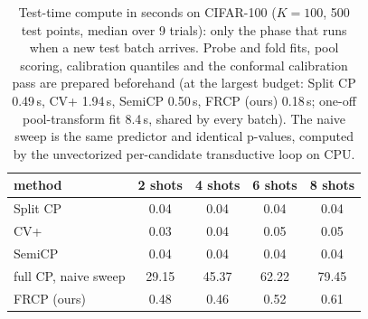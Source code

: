 \begin{table}[t]
\centering
\small
\setlength{\tabcolsep}{5pt}
\caption{Test-time compute in seconds on CIFAR-100 ($K=100$, 500 test points, median over 9 trials): only the phase that runs when a new test batch arrives. Probe and fold fits, pool scoring, calibration quantiles and the conformal calibration pass are prepared beforehand (at the largest budget: Split CP 0.49\,s, CV+ 1.94\,s, SemiCP 0.50\,s, FRCP (ours) 0.18\,s; one-off pool-transform fit 8.4\,s, shared by every batch). The naive sweep is the same predictor and identical p-values, computed by the unvectorized per-candidate transductive loop on CPU.}
\label{tab:runtime-cifar100}
\begin{tabular}{lcccc}
\toprule
method & 2 shots & 4 shots & 6 shots & 8 shots\\
\midrule
Split CP & 0.04 & 0.04 & 0.04 & 0.04\\
CV+ & 0.03 & 0.04 & 0.05 & 0.05\\
SemiCP & 0.04 & 0.04 & 0.04 & 0.04\\
full CP, naive sweep & 29.15 & 45.37 & 62.22 & 79.45\\
FRCP (ours) & 0.48 & 0.46 & 0.52 & 0.61\\
\bottomrule
\end{tabular}
\end{table}
